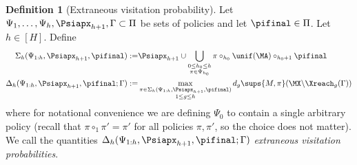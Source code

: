 \documentclass[11pt, oneside]{article}
\theoremstyle{plain}
\theoremstyle{definition}
\newtheorem{definition}[theorem]{Definition}
\numberwithin{theorem}{section}
\renewcommand{\^}[1]{^{(#1)}}
\begin{document}
   




\begin{definition}[{Extraneous visitation probability}]\label{def:extra-vis-prob}
  Let $\Psi_1,\dots,\Psi_h,\Psiapx_{h+1},\Gamma \subset \Pi$ %
  be sets of policies and let $\pifinal \in \Pi$. Let $h \in [H]$. Define 
  \begin{align}
    \Sigma_h(\Psi_{1:h},\Psiapx_{h+1}, \pifinal) :=& \Psiapx_{h+1} \cup \bigcup_{\substack{0 \leq h_0 \leq h \\ \pi \in \Psi_{h_0}}} \pi \circ_{h_0} \unif(\MA) \circ_{h_0+1} \pifinal \label{eq:sigma-gamma-psi}\\
    \Delta_h(\Psi_{1:h},\Psiapx_{h+1}, \pifinal;\Gamma) :=& \max_{\substack{\pi \in \Sigma_h(\Psi_{1:h}, \Psiapx_{h+1}, \pifinal) \\ 1 \leq g \leq h}} d_g\sups{M,\pi}(\MX \backslash \Xreach_g(\Gamma))  %
    \label{eq:delta-gamma-psi}
  \end{align}
  where for notational convenience we are defining $\Psi_0$ to contain a single arbitrary policy (recall that $\pi \circ_1 \pi' = \pi'$ for all policies $\pi,\pi'$, so the choice does not matter). We call the quantities $\Delta_h(\Psi_{1:h}, \Psiapx_{h+1}, \pifinal; \Gamma)$ \emph{extraneous visitation probabilities}. 
\end{definition}
\end{document}
